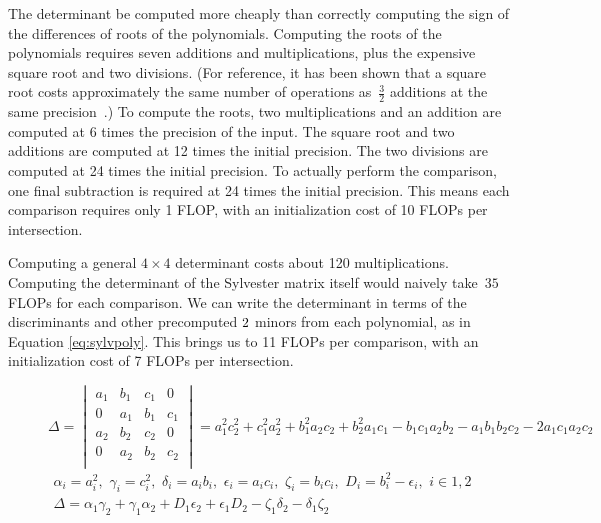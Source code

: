 \documentclass{cccg16}
\begin{document}
The determinant 
be computed more cheaply than correctly computing the sign of the
differences of roots of the polynomials.  Computing the roots of the
polynomials requires seven additions and multiplications, plus the
expensive square root and two divisions.  (For reference, it has been
shown that a square root costs approximately the same number of
operations as~$\frac{3}{2}$ additions at the same precision~\cite{karatsuba}.)  To compute the roots, two multiplications and an
addition are computed at 6 times the precision of the input.  The
square root and two additions are computed at 12 times the initial
precision.  The two divisions are computed at 24 times the initial
precision.  To actually perform the comparison, one final subtraction
is required at 24 times the initial precision. This means each
comparison requires only 1 FLOP, with an initialization cost of 10
FLOPs per intersection.

Computing a general $4\times 4$ determinant costs about
120 multiplications.  Computing the determinant of the Sylvester
matrix itself would naively take~$35$ FLOPs for each comparison.  
We can write the determinant in terms of the discriminants and other precomputed $2\time 2$ minors from each polynomial, as in Equation
\ref{eq:sylvpoly}.    This brings us to 11 FLOPs per comparison, with an initialization cost of 7
FLOPs per intersection.

\begin{figure}
  \begin{equation*}
    \Delta=\begin{vmatrix}
    a_1 & b_1 & c_1 & 0\\
    0 & a_1 & b_1 & c_1\\
    a_2 & b_2 & c_2 & 0\\
    0 & a_2 & b_2 & c_2\\
    \end{vmatrix}=
    a_1^2 c_2^2 + c_1^2 a_2^2 + b_1^2 a_2 c_2 + b_2^2 a_1 c_1 -
    b_1 c_1 a_2 b_2 - a_1 b_1 b_2 c_2 - 2 a_1 c_1 a_2 c_2
  \end{equation*}
  \begin{align}
    \alpha_i=a_i^2,\,\, \gamma_i=c_i^2,\,\,
    \delta_i=a_i b_i,\,\, \epsilon_i=a_i c_i,\,\, \zeta_i=b_i c_i,\,\,
    D_i=b_i^2-\epsilon_i,\,\,
    i\in {1, 2}\\
    \Delta = \alpha_1 \gamma_2 + \gamma_1 \alpha_2 +
    D_1 \epsilon_2 + \epsilon_1 D_2 - \zeta_1 \delta_2 -
    \delta_1 \zeta_2
  \label{eq:sylvpoly}
  \end{align}
\end{figure}
\end{document}
